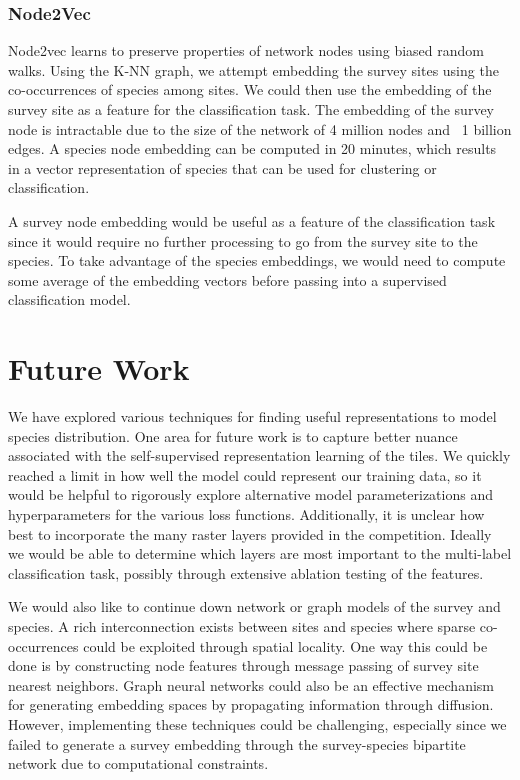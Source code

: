 \subsubsection{Node2Vec}

Node2vec \cite{grover2016node2vec} learns to preserve properties of network nodes using biased random walks.
Using the K-NN graph, we attempt embedding the survey sites using the co-occurrences of species among sites.
We could then use the embedding of the survey site as a feature for the classification task.
The embedding of the survey node is intractable due to the size of the network of 4 million nodes and ~1 billion edges. 
A species node embedding can be computed in 20 minutes, which results in a vector representation of species that can be used for clustering or classification.

A survey node embedding would be useful as a feature of the classification task since it would require no further processing to go from the survey site to the species. 
To take advantage of the species embeddings, we would need to compute some average of the embedding vectors before passing into a supervised classification model.

\section{Future Work}

We have explored various techniques for finding useful representations to model species distribution.
One area for future work is to capture better nuance associated with the self-supervised representation learning of the tiles.
We quickly reached a limit in how well the model could represent our training data, so it would be helpful to rigorously explore alternative model parameterizations and hyperparameters for the various loss functions.
Additionally, it is unclear how best to incorporate the many raster layers provided in the competition.
Ideally we would be able to determine which layers are most important to the multi-label classification task, possibly through extensive ablation testing of the features.

We would also like to continue down network or graph models of the survey and species.
A rich interconnection exists between sites and species where sparse co-occurrences could be exploited through spatial locality.
One way this could be done is by constructing node features through message passing of survey site nearest neighbors.
Graph neural networks could also be an effective mechanism for generating embedding spaces by propagating information through diffusion.
However, implementing these techniques could be challenging, especially since we failed to generate a survey embedding through the survey-species bipartite network due to computational constraints.


